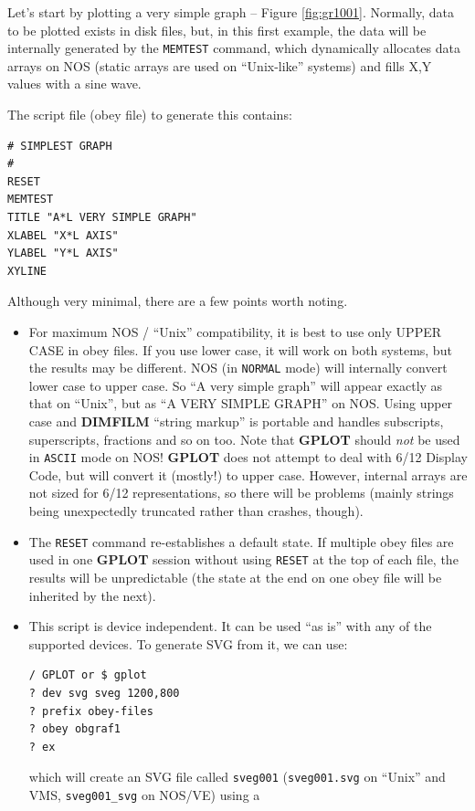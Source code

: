 \documentclass[a4paper,twoside,11pt]{article}
\newcommand{\newpara}{\par\vspace{4mm}\noindent}
\begin{document}
Let's start by plotting a very simple graph -- Figure \ref{fig:gr1001}.
Normally, data to be
plotted exists in disk files, but, in this first example, the data
will be internally generated by the \texttt{MEMTEST} command, which dynamically
allocates data arrays on NOS (static arrays are used on ``Unix-like'' systems)
and fills X,Y values with a sine wave.

\newpara
The script file (obey file) to generate this contains:
\begin{lstlisting}
# SIMPLEST GRAPH
#
RESET
MEMTEST
TITLE "A*L VERY SIMPLE GRAPH"
XLABEL "X*L AXIS"
YLABEL "Y*L AXIS"
XYLINE
\end{lstlisting}

\newpara
Although very minimal, there are a few points worth noting.

\begin{itemize}
\item For maximum NOS / ``Unix'' compatibility, it is best to use only UPPER CASE in obey files.
If you use lower case, it will work on both systems, but the results may be different. 
NOS (in \texttt{NORMAL} mode) will internally convert lower case to upper case. 
So ``A very simple graph'' will appear exactly as that on ``Unix'', but as ``A VERY SIMPLE GRAPH'' on NOS. 
Using upper case and \textbf{DIMFILM} ``string markup'' is portable and handles subscripts, superscripts, 
fractions and so on too. Note that \textbf{GPLOT} should \emph{not} be used in \texttt{ASCII} mode on NOS! 
\textbf{GPLOT} does not attempt to deal with 6/12 Display Code, but will convert it (mostly!) to upper case. 
However, internal arrays are not sized for 6/12 representations, so there will be problems 
(mainly strings being unexpectedly truncated rather than crashes, though).
\item The \texttt{RESET} command re-establishes a default state. If multiple obey files are used in one \textbf{GPLOT} session
without using \texttt{RESET} at the top of each file, the results will be unpredictable (the state 
at the end on one obey file will be inherited by the next).
\item This script is device independent. It can be used ``as is'' with any of the supported devices.
To generate SVG from it, we can use:
\begin{lstlisting}
/ GPLOT or $ gplot
? dev svg sveg 1200,800
? prefix obey-files
? obey obgraf1
? ex
\end{lstlisting}
which will create an SVG file called \texttt{sveg001} (\texttt{sveg001.svg} on ``Unix'' and VMS,
\texttt{sveg001\_svg} on NOS/VE) using a 

\end{itemize}
\end{document}
